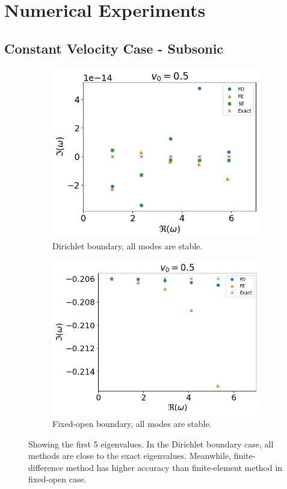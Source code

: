 \chapter{Numerical Experiments}
\section{Constant Velocity Case - Subsonic}
\begin{figure}[H]
  \centering
  \begin{subfigure}{0.45\textwidth}
    \includegraphics[width=0.9\linewidth]{figures/numerical-experiments/fixed-fixed/constant-v-v0=0.5}
    \caption{Dirichlet boundary, all modes are stable.}
  \end{subfigure}%
  \begin{subfigure}{0.45\textwidth}
    \includegraphics[width=\linewidth]{figures/numerical-experiments/fixed-open/constant-v-v0=0.5}
    \caption{Fixed-open boundary, all modes are stable.}
  \end{subfigure}
  \caption{Showing the first 5 eigenvalues. In the Dirichlet boundary case, all methods are close to the exact eigenvalues. Meanwhile, finite-difference method has higher accuracy than finite-element method in fixed-open case.}
  \label{fig:constant-v-subsonic}
\end{figure}

